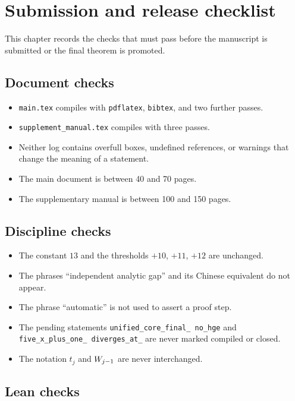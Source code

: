 \section{Submission and release checklist}

This chapter records the checks that must pass before the manuscript
is submitted or the final theorem is promoted.

\subsection{Document checks}

\begin{itemize}[leftmargin=*]
\item \texttt{main.tex} compiles with
  \texttt{pdflatex}, \texttt{bibtex}, and two further passes.
\item \texttt{supplement\_manual.tex} compiles with three passes.
\item Neither log contains overfull boxes, undefined references, or
  warnings that change the meaning of a statement.
\item The main document is between 40 and 70 pages.
\item The supplementary manual is between 100 and 150 pages.
\end{itemize}

\subsection{Discipline checks}

\begin{itemize}[leftmargin=*]
\item The constant $13$ and the thresholds $+10$, $+11$, $+12$ are
  unchanged.
\item The phrases ``independent analytic gap'' and its Chinese
  equivalent do not appear.
\item The phrase ``automatic'' is not used to assert a proof step.
\item The pending statements
  \texttt{unified\_\allowbreak core\_\allowbreak final\_\allowbreak
  no\_\allowbreak hge} and
  \texttt{five\_\allowbreak x\_\allowbreak plus\_\allowbreak one\_\allowbreak
  diverges\_\allowbreak at\_} are never marked compiled or
  closed.
\item The notation $t_j$ and $W_{j-1}$ are never
  interchanged.
\end{itemize}

\subsection{Lean checks}

